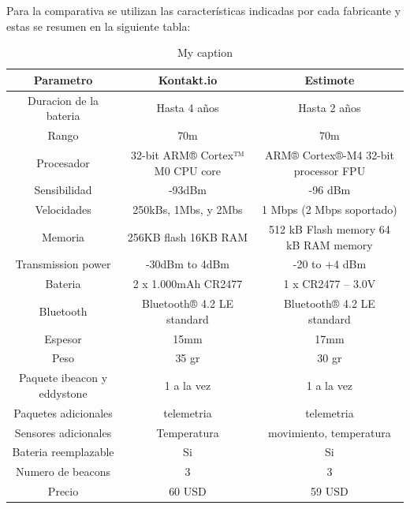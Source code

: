 Para la comparativa se utilizan las características indicadas por cada fabricante y estas se resumen en la siguiente tabla:

\begin{table}[]
\centering
\caption{My caption}
\label{my-label}
\begin{tabular}{|c|c|c|}
Parametro                   & Kontakt.io                      & Estimote                             \\ \hline
Duracion de la bateria      & Hasta 4 años                    & Hasta 2 años                         \\ \hline
Rango                       & 70m                             & 70m                                  \\ \hline
Procesador                  & 32-bit ARM® Cortex™ M0 CPU core & ARM® Cortex®-M4 32-bit processor FPU \\ \hline
Sensibilidad                & -93dBm                          & -96 dBm                              \\ \hline
Velocidades                 & 250kBs, 1Mbs, y 2Mbs            & 1 Mbps (2 Mbps soportado)            \\ \hline
Memoria                     & 256KB flash 16KB RAM            & 512 kB Flash memory 64 kB RAM memory \\ \hline
Transmission power          & -30dBm to 4dBm                  & -20 to +4 dBm                        \\ \hline
Bateria                     & 2 x 1.000mAh CR2477             & 1 x CR2477 – 3.0V                    \\ \hline
Bluetooth                   & Bluetooth® 4.2 LE standard      & Bluetooth® 4.2 LE standard           \\ \hline
Espesor                     & 15mm                            & 17mm                                 \\ \hline
Peso                        & 35 gr                           & 30 gr                                \\ \hline
Paquete ibeacon y eddystone & 1 a la vez                      & 1 a la vez                           \\ \hline
Paquetes adicionales        & telemetria                      & telemetria                           \\ \hline
Sensores adicionales        & Temperatura                     & movimiento, temperatura              \\ \hline
Bateria reemplazable        & Si                              & Si                                   \\ \hline
Numero de beacons           & 3                               & 3                                    \\ \hline
Precio                      & 60 USD                          & 59 USD                               \\ \hline
\end{tabular}
\end{table}

